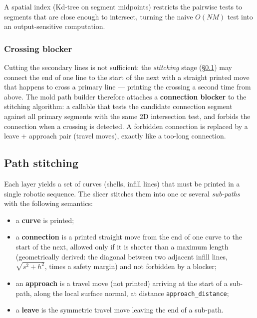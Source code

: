 A spatial index (Kd-tree on segment midpoints) restricts the pairwise
tests to segments that are close enough to intersect, turning the
naive $O(NM)$ test into an output-sensitive computation.

\subsubsection{Crossing blocker}

Cutting the secondary lines is not sufficient: the \emph{stitching}
stage (\S\ref{sec:meth-stitching}) may connect the end of one line to
the start of the next with a straight printed move that happens to
cross a primary line --- printing the crossing a second time from
above. The mold path builder therefore attaches a
\textbf{connection blocker} to the stitching algorithm: a callable
that tests the candidate connection segment against all primary
segments with the same 2D intersection test, and forbids the
connection when a crossing is detected. A forbidden connection is
replaced by a leave + approach pair (travel moves), exactly like a
too-long connection.

\subsection{Path stitching}\label{sec:meth-stitching}

Each layer yields a set of curves (shells, infill lines) that must be
printed in a single robotic sequence. The slicer stitches them into
one or several \emph{sub-paths} with the following semantics:

\begin{itemize}
  \item a \textbf{curve} is printed;
  \item a \textbf{connection} is a printed straight move from the end
        of one curve to the start of the next, allowed only if it is
        shorter than a maximum length
        (geometrically derived: the diagonal between two adjacent
        infill lines, $\sqrt{s^2 + h^2}$, times a safety margin) and
        not forbidden by a blocker;
  \item an \textbf{approach} is a travel move (not printed) arriving
        at the start of a sub-path, along the local surface normal,
        at distance \texttt{approach\_distance};
  \item a \textbf{leave} is the symmetric travel move leaving the end
        of a sub-path.
\end{itemize}

